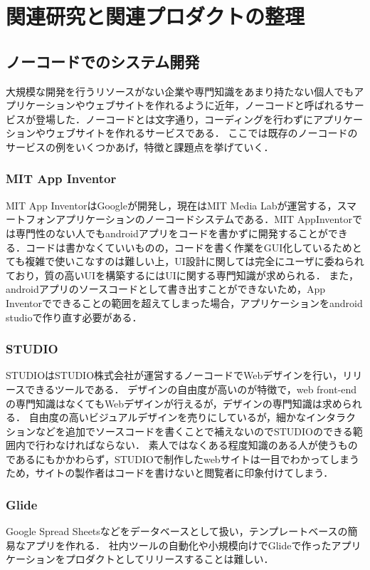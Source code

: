 
\chapter{関連研究と関連プロダクトの整理}
\label{chap:prevresearch}

\section{ノーコードでのシステム開発}
大規模な開発を行うリソースがない企業や専門知識をあまり持たない個人でもアプリケーションやウェブサイトを作れるように近年，ノーコードと呼ばれるサービスが登場した．ノーコードとは文字通り，コーディングを行わずにアプリケーションやウェブサイトを作れるサービスである．
ここでは既存のノーコードのサービスの例をいくつかあげ，特徴と課題点を挙げていく．

\subsection{MIT App Inventor}
MIT App Inventor\cite{mitappinventor}はGoogleが開発し，現在はMIT Media Labが運営する，スマートフォンアプリケーションのノーコードシステムである．MIT AppInventorでは専門性のない人でもandroidアプリをコードを書かずに開発することができる．コードは書かなくていいものの，コードを書く作業をGUI化しているためとても複雑で使いこなすのは難しい上，UI設計に関しては完全にユーザに委ねられており，質の高いUIを構築するにはUIに関する専門知識が求められる．
また，androidアプリのソースコードとして書き出すことができないため，App Inventorでできることの範囲を超えてしまった場合，アプリケーションをandroid studioで作り直す必要がある．
\subsection{STUDIO}
STUDIOはSTUDIO株式会社が運営するノーコードでWebデザインを行い，リリースできるツールである．
デザインの自由度が高いのが特徴で，web front-endの専門知識はなくてもWebデザインが行えるが，デザインの専門知識は求められる．
自由度の高いビジュアルデザインを売りにしているが，細かなインタラクションなどを追加でソースコードを書くことで補えないのでSTUDIOのできる範囲内で行わなければならない．
素人ではなくある程度知識のある人が使うものであるにもかかわらず，STUDIOで制作したwebサイトは一目でわかってしまうため，サイトの製作者はコードを書けないと閲覧者に印象付けてしまう．

\subsection{Glide}
Google Spread Sheetsなどをデータベースとして扱い，テンプレートベースの簡易なアプリを作れる．
社内ツールの自動化や小規模向けでGlideで作ったアプリケーションをプロダクトとしてリリースすることは難しい．

